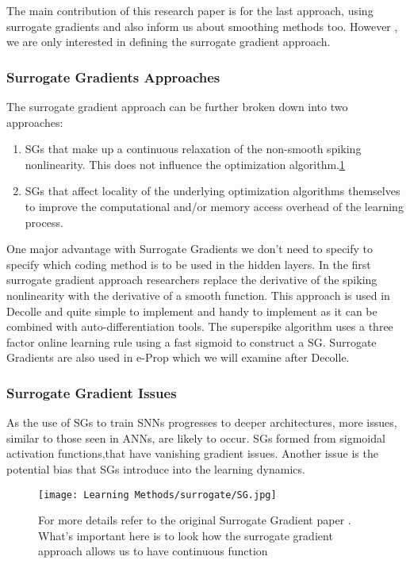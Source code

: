 \documentclass[12pt]{report}
\begin{document}
The main contribution of this research paper is for the last approach, using surrogate gradients and also inform us about smoothing methods too. However , we are only interested in defining the surrogate gradient approach.
\subsubsection{Surrogate Gradients Approaches}
The surrogate gradient approach can be further broken down into two approaches:
\begin{enumerate}
    \item SGs that make up a continuous relaxation
of the non-smooth spiking nonlinearity. This does not influence the optimization algorithm.\ref{fig:sg}
    \item SGs that affect locality of the underlying optimization algorithms themselves to improve the computational and/or memory access overhead of the learning process. 
\end{enumerate}
One major advantage with Surrogate Gradients we don't need to specify to specify which coding method is to be used in the hidden layers. In the first surrogate gradient approach researchers replace the derivative of the spiking nonlinearity with the derivative of a smooth function. This approach is used in Decolle and quite simple to implement and handy to implement as it can be combined with auto-differentiation tools. The superspike algorithm uses a three factor online learning rule using a fast sigmoid to construct a SG. Surrogate Gradients are also used in e-Prop which we will examine after Decolle. 
\subsubsection{Surrogate Gradient Issues}
As the use of SGs to train SNNs progresses to deeper architectures, more issues, similar to those seen in ANNs, are likely to occur. SGs formed from sigmoidal activation functions,that have vanishing gradient issues. Another issue is the potential bias that SGs introduce into the learning dynamics.

\begin{figure}[htp]
    \centering
    \texttt{[image: Learning Methods/surrogate/SG.jpg]}
    \caption{For more details refer to the original Surrogate Gradient paper \cite{Neftci2019}. What's important here is to look how the surrogate gradient approach allows us to have continuous function}
    \label{fig:sg}
\end{figure}
\end{document}
